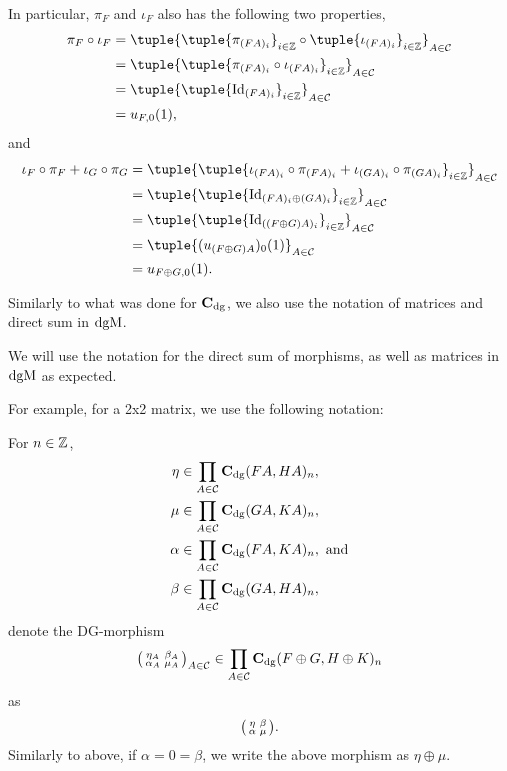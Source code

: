 \begin{remark}
    In particular, \( \pi_F \) and \( \iota_F \) also has the following two properties,
    \begin{align*}
        \pi_F \circ \iota_F &= \tuple{ \tuple{ \pi_{(F A)_i} }_{i \in \Zb} \circ \tuple{ \iota_{(F A)_i} }_{i \in \Zb} }_{A \in \Cc} \\
        &= \tuple{ \tuple{ \pi_{(F A)_i} \circ \iota_{(F A)_i} }_{i \in \Zb} }_{A \in \Cc} \\
        &= \tuple{ \tuple{ \Id_{(F A)_i} }_{i \in \Zb} }_{A \in \Cc} \\
        &= u_{F, 0}(1),
    \end{align*}
    and
    \begin{align*}
        \iota_F \circ \pi_F + \iota_G \circ \pi_G &= \tuple{ \tuple{\iota_{(F A)_i} \circ \pi_{(F A)_i} + \iota_{(G A)_i} \circ \pi_{(G A)_i} }_{i \in \Zb} }_{A \in \Cc} \\
        &= \tuple{ \tuple{ \Id_{(F A)_i \oplus (G A)_i} }_{i \in \Zb} }_{A \in \Cc} \\
        &= \tuple{ \tuple{ \Id_{((F \oplus G) A)_i} }_{i \in \Zb} }_{A \in \Cc} \\
        &= \tuple{ (u_{(F \oplus G) A})_0 (1)}_{A \in \Cc} \\
        &= u_{F \oplus G, 0} (1).
    \end{align*}
\end{remark}

Similarly to what was done for \( \operatorname{\mathbf{C}}_{\operatorname{dg}} \), we also use the notation of matrices and direct sum in \( \operatorname{dgM} \).
\begin{notation}
    We will use the notation for the direct sum of morphisms, as well as matrices in \( \operatorname{dgM} \) as expected.

    For example, for a 2x2 matrix, we use the following notation:

    For \( n \in {\mathbb{Z}} \),
    \begin{align*}
        \eta &\in \prod_{A \in {\mathcal{C}}} \operatorname{\mathbf{C}}_{\operatorname{dg}}(F A, H A)_n, \\
        \mu &\in \prod_{A \in {\mathcal{C}}} \operatorname{\mathbf{C}}_{\operatorname{dg}}(G A, K A)_n, \\
        \alpha &\in \prod_{A \in {\mathcal{C}}} \operatorname{\mathbf{C}}_{\operatorname{dg}}(F A, K A)_n, \text{ and} \\
        \beta &\in \prod_{A \in {\mathcal{C}}} \operatorname{\mathbf{C}}_{\operatorname{dg}}(G A, H A)_n,
    \end{align*}
    denote the DG-morphism
    \[
        \begin{psmallmatrix}
            \eta_A & \beta_A \\
            \alpha_A & \mu_A
        \end{psmallmatrix}_{A \in {\mathcal{C}}}
        \in
        \prod_{A \in {\mathcal{C}}} \operatorname{\mathbf{C}}_{\operatorname{dg}}(F \oplus G, H \oplus K)_n
    \]
    as
    \[
        \begin{psmallmatrix}
            \eta & \beta \\
            \alpha & \mu
        \end{psmallmatrix}.
    \]
    Similarly to above, if \( \alpha = 0 = \beta \), we write the above morphism as \( \eta \oplus \mu \).
\end{notation}

